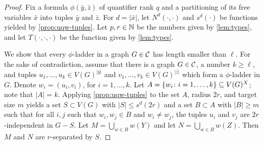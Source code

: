 \begin{proof}%
Fix a formula $\phi(\bar y,\bar z)$ of quantifier rank $q$ and
a partitioning of its 
free variables $\bar x$ into tuples $\bar y$ and $\bar z$.
For $d=|\bar x|$,
let $N^d(\cdot,\cdot)$ and $s^d(\cdot)$ be functions yielded by \cref{prop:uqw-tuples}.
Let $p,r\in \N$ be the numbers given by \cref{lem:types}, and let
$T(\cdot,\cdot,\cdot)$ be the function given by \cref{lem:types}.

We show that 
every $\phi$-ladder in a graph $G\in\cal C$ has length smaller than $\ell$. 
For the sake of contradiction, assume that there is a graph $G\in\cal C$, a number $k\ge \ell$,
and tuples $u_1,\ldots,u_k\in V(G)^{|\bar y|}$ and $ v_1,\ldots, v_k\in V(G)^{|\bar z|}$
which form a $\phi$-ladder in $G$.
Denote $w_i=(u_i, v_i)$, for $i=1,\ldots,k$.
	Let $A=\set{ w_i\colon i=1,\ldots,k}\subset V(G)^X$; note that $|A|=k$.
Applying \cref{prop:uqw-tuples} to the set $A$, radius $2r$, and target size $m$
		 yields a set $S\subset V(G)$ with $|S|\le s^d(2r)$
	and a set $B\subset A$ with $|B|\geq m$ 
such that for all $i,j$ such that $w_i,w_j\in B$
	and $w_i\neq w_j$,
	the tuples $u_i$ and $v_j$ are $2r$-independent in $G-S$.
		Let $M=\bigcup_{w\in B} w(Y)$
		and let $N=\bigcup_{w\in B} w(Z)$.
	 Then $M$ and $N$ are $r$-separated by $S$.
	

\end{proof}
